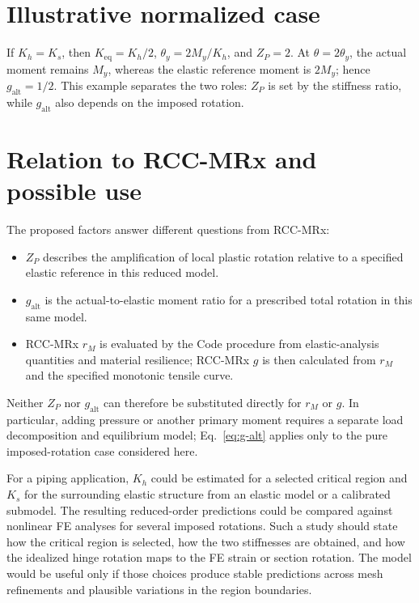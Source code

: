 \documentclass[11pt,a4paper]{article}
\begin{document}
\section{Illustrative normalized case}

If $K_h=K_s$, then $K_{\mathrm{eq}}=K_h/2$, $\theta_y=2M_y/K_h$, and $Z_P=2$. At $\theta=2\theta_y$, the actual moment remains $M_y$, whereas the elastic reference moment is $2M_y$; hence $g_{\mathrm{alt}}=1/2$. This example separates the two roles: $Z_P$ is set by the stiffness ratio, while $g_{\mathrm{alt}}$ also depends on the imposed rotation.

\section{Relation to RCC-MRx and possible use}

The proposed factors answer different questions from RCC-MRx:
\begin{itemize}
\item $Z_P$ describes the amplification of local plastic rotation relative to a specified elastic reference in this reduced model.
\item $g_{\mathrm{alt}}$ is the actual-to-elastic moment ratio for a prescribed total rotation in this same model.
\item RCC-MRx $r_M$ is evaluated by the Code procedure from elastic-analysis quantities and material resilience; RCC-MRx $g$ is then calculated from $r_M$ and the specified monotonic tensile curve.
\end{itemize}
Neither $Z_P$ nor $g_{\mathrm{alt}}$ can therefore be substituted directly for $r_M$ or $g$. In particular, adding pressure or another primary moment requires a separate load decomposition and equilibrium model; Eq.~\eqref{eq:g-alt} applies only to the pure imposed-rotation case considered here.

For a piping application, $K_h$ could be estimated for a selected critical region and $K_s$ for the surrounding elastic structure from an elastic model or a calibrated submodel. The resulting reduced-order predictions could be compared against nonlinear FE analyses for several imposed rotations. Such a study should state how the critical region is selected, how the two stiffnesses are obtained, and how the idealized hinge rotation maps to the FE strain or section rotation. The model would be useful only if those choices produce stable predictions across mesh refinements and plausible variations in the region boundaries.
\end{document}
